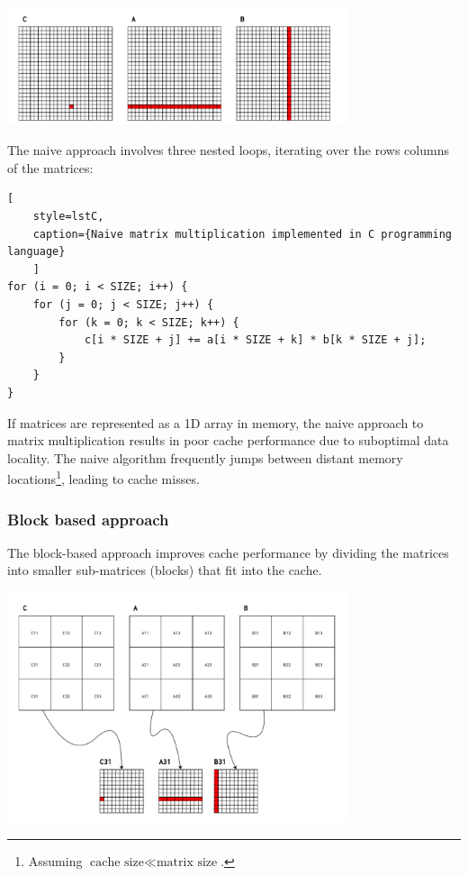 \begin{center}
	\centering
	\includegraphics[width=0.75\textwidth]{figures/05-analysis/mm_naive.pdf}
	\label{fig:mm_naive}
\end{center}

The naive approach involves three nested loops, iterating over the rows columns of the matrices:

\begin{center}
\centering
\begin{minipage}{\linewidth}
\begin{lstlisting}[
	style=lstC,
    caption={Naive matrix multiplication implemented in C programming language}
    ]
for (i = 0; i < SIZE; i++) {
	for (j = 0; j < SIZE; j++) {
		for (k = 0; k < SIZE; k++) {
			c[i * SIZE + j] += a[i * SIZE + k] * b[k * SIZE + j];
		}
	}
}
\end{lstlisting}
\end{minipage}
\end{center}

\noindent If matrices are represented as a 1D array in memory, the naive approach to matrix multiplication results in poor cache performance due to suboptimal data locality.
The naive algorithm frequently jumps between distant memory locations\footnote{Assuming $\text{cache size} \ll \text{matrix size}$.}, leading to cache misses.

\subsubsection{Block based approach}
The block-based approach improves cache performance by dividing the matrices into smaller sub-matrices (blocks) that fit into the cache.

\begin{center}
	\centering
	\includegraphics[width=0.75\textwidth]{figures/05-analysis/mm_block.pdf}
	\label{fig:mm_block}
\end{center}

